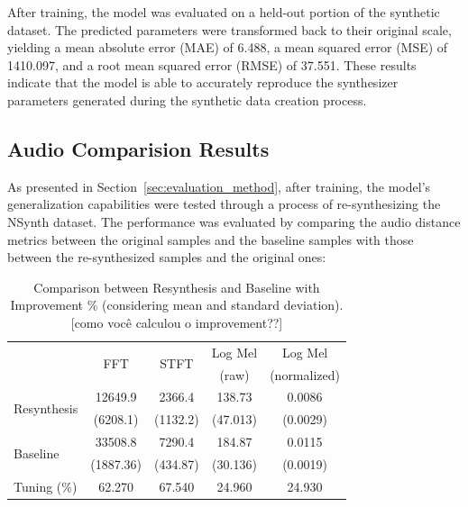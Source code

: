 \documentclass[10pt,conference]{IEEEtran}
\newcommand{\basg}[1]{{\color{blue}[#1]}}
\begin{document}
After training, the model was evaluated on a held-out portion of the synthetic dataset. The predicted parameters were transformed back to their original scale, yielding a mean absolute error (MAE) of 6.488, a mean squared error (MSE) of 1410.097, and a root mean squared error (RMSE) of 37.551. These results indicate that the model is able to accurately reproduce the synthesizer parameters generated during the synthetic data creation process.


\subsection{Audio Comparision Results}

As presented in Section~\ref{sec:evaluation_method}, after training, the model’s generalization capabilities were tested through a process of re-synthesizing the NSynth dataset. The performance was evaluated by comparing the audio distance metrics between the original samples and the baseline samples with those between the re-synthesized samples and the original ones:


\begin{table}[htb] \small %
  \caption{Comparison between Resynthesis and Baseline with Improvement \% (considering mean and standard deviation). \basg{como você calculou o improvement??}}
  \label{tab:metrics}
\begin{tabular*}{\columnwidth}
	{@{\extracolsep{\fill}}lcccc}
        \toprule
        & \multirow{2}{*}{FFT} & \multirow{2}{*}{STFT} & Log Mel & Log Mel \\ 
        & & & (raw) & (normalized) \\
        
        \midrule
        \multirow{2}{*}{Resynthesis} & 12649.9 & 2366.4 & 138.73 & 0.0086 \\
        & (6208.1) & (1132.2) & (47.013) & (0.0029) \\ 
        \multirow{2}{*}{Baseline} & 33508.8 & 7290.4 & 184.87 & 0.0115 \\
        & (1887.36) & (434.87) & (30.136) & (0.0019) \\
        \midrule
        Tuning (\%) & 62.270 & 67.540 & 24.960 & 24.930 \\
        \bottomrule
    \end{tabular*}
    \label{tab:metrics}
\end{table}
\end{document}
